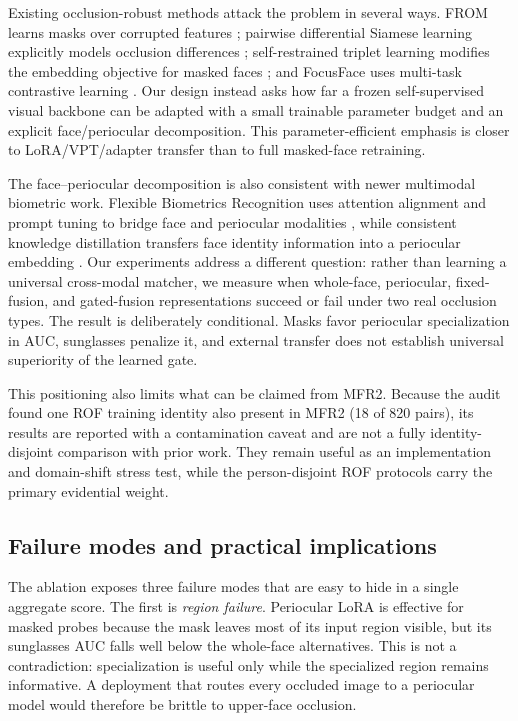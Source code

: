 \documentclass[10pt,journal,compsoc]{IEEEtran}
\begin{document}
Existing occlusion-robust methods attack the problem in several ways. FROM learns masks over corrupted features \cite{from2022}; pairwise differential Siamese learning explicitly models occlusion differences \cite{masklearn}; self-restrained triplet learning modifies the embedding objective for masked faces \cite{umr}; and FocusFace uses multi-task contrastive learning \cite{focusface}. Our design instead asks how far a frozen self-supervised visual backbone can be adapted with a small trainable parameter budget and an explicit face/periocular decomposition. This parameter-efficient emphasis is closer to LoRA/VPT/adapter transfer \cite{lora,vpt,adaptformer} than to full masked-face retraining.

The face--periocular decomposition is also consistent with newer multimodal biometric work. Flexible Biometrics Recognition uses attention alignment and prompt tuning to bridge face and periocular modalities \cite{fbr2024}, while consistent knowledge distillation transfers face identity information into a periocular embedding \cite{ckd2024}. Our experiments address a different question: rather than learning a universal cross-modal matcher, we measure when whole-face, periocular, fixed-fusion, and gated-fusion representations succeed or fail under two real occlusion types. The result is deliberately conditional. Masks favor periocular specialization in AUC, sunglasses penalize it, and external transfer does not establish universal superiority of the learned gate.

This positioning also limits what can be claimed from MFR2. Because the audit found one ROF training identity also present in MFR2 (18 of 820 pairs), its results are reported with a contamination caveat and are not a fully identity-disjoint comparison with prior work. They remain useful as an implementation and domain-shift stress test, while the person-disjoint ROF protocols carry the primary evidential weight.

\subsection{Failure modes and practical implications}
The ablation exposes three failure modes that are easy to hide in a single aggregate score. The first is \emph{region failure}. Periocular LoRA is effective for masked probes because the mask leaves most of its input region visible, but its sunglasses AUC falls well below the whole-face alternatives. This is not a contradiction: specialization is useful only while the specialized region remains informative. A deployment that routes every occluded image to a periocular model would therefore be brittle to upper-face occlusion.
\end{document}

